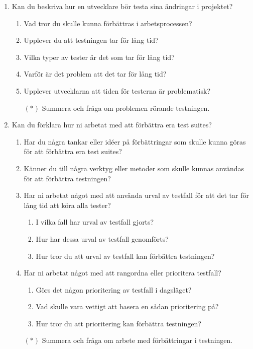 \begin{otherlanguage}{swedish}
\begin{enumerate}
  \item\label{itm:int:test} Kan du beskriva hur en utvecklare bör testa sina ändringar i projektet?
  \begin{enumerate}
    \item\label{itm:int:test:a} Vad tror du skulle kunna förbättras i arbetsprocessen?
    \item\label{itm:int:test:b} Upplever du att testningen tar för lång tid?
    \item\label{itm:int:test:c} Vilka typer av tester är det som tar för lång tid?
    \item\label{itm:int:test:d} Varför är det problem att det tar för lång tid?
    \item\label{itm:int:test:e} Upplever utvecklarna att tiden för testerna är problematisk?
    \item[$(*)$] Summera och fråga om problemen rörande testningen.
  \end{enumerate}
  
  \item\label{itm:int:improve} Kan du förklara hur ni arbetat med att förbättra era test suites?
  \begin{enumerate}
    \item\label{itm:int:improve:a} Har du några tankar eller idéer på förbättringar som skulle kunna göras för att förbättra era test suites?
    \item\label{itm:int:improve:b} Känner du till några verktyg eller metoder som skulle kunnas användas för att förbättra testningen?
    \item\label{itm:int:improve:c} Har ni arbetat något med att använda urval av testfall för att det tar för lång tid att köra alla tester?
    \begin{enumerate}
      \item\label{itm:int:improve:c:i} I vilka fall har urval av testfall gjorts?
      \item\label{itm:int:improve:c:ii} Hur har dessa urval av testfall genomförts?
      \item\label{itm:int:improve:c:iii} Hur tror du att urval av testfall kan förbättra testningen?
    \end{enumerate}
    \item\label{itm:int:improve:d} Har ni arbetat något med att rangordna eller prioritera testfall?
    \begin{enumerate}
      \item\label{itm:int:improve:d:i} Görs det någon prioritering av testfall i dagsläget?
      \item\label{itm:int:improve:d:ii} Vad skulle vara vettigt att basera en sådan prioritering på?
      \item\label{itm:int:improve:d:iii} Hur tror du att prioritering kan förbättra testningen?
    \end{enumerate}
    \item[$(*)$]	 Summera och fråga om arbete med förbättringar i testningen.
  \end{enumerate}
\end{enumerate}
\end{otherlanguage}

